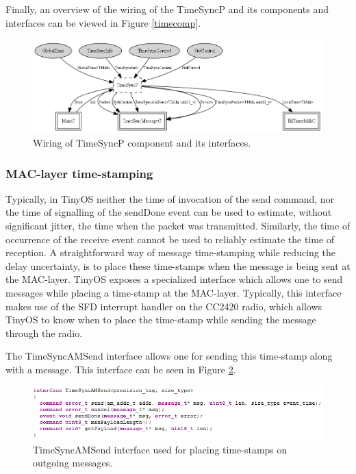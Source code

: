 Finally, an overview of the wiring of the TimeSyncP and its components and interfaces can be viewed in Figure \ref{timecomp}.

\begin{figure}[!htb]
\begin{center}
\includegraphics[scale=0.4]{./images/35-ttsp-interface_wiring2.png}
\end{center}
\caption{Wiring of TimeSyncP component and its interfaces.}
\label{timewiring}
\end{figure}

\subsubsection{MAC-layer time-stamping}
Typically, in TinyOS neither the time of invocation of the send command, nor the time of signalling of the sendDone event can be used to estimate, without significant jitter, the time when the packet was transmitted. Similarly, the time of occurrence of the receive event cannot be used to reliably estimate the time of reception. A straightforward way of message time-stamping while reducing the delay uncertainty, is to place these time-stamps when the message is being sent at the MAC-layer. TinyOS exposes a specialized interface which allows one to send messages while placing a time-stamp at the MAC-layer. Typically, this interface makes use of the \ac{SFD} interrupt handler on the CC2420 radio, which allows TinyOS to know when to place the time-stamp while sending the message through the radio.

The TimeSyncAMSend interface allows one for sending this time-stamp along with a message. This interface can be seen in Figure \ref{timesyncamsend}.

\begin{figure}[!htb]
\begin{center}
\includegraphics[scale=0.5]{./images/31-ttsp-mac_timestamp.png}
\end{center}
\caption{TimeSyncAMSend interface used for placing time-stamps on outgoing messages.}
\label{timesyncamsend}
\end{figure}

